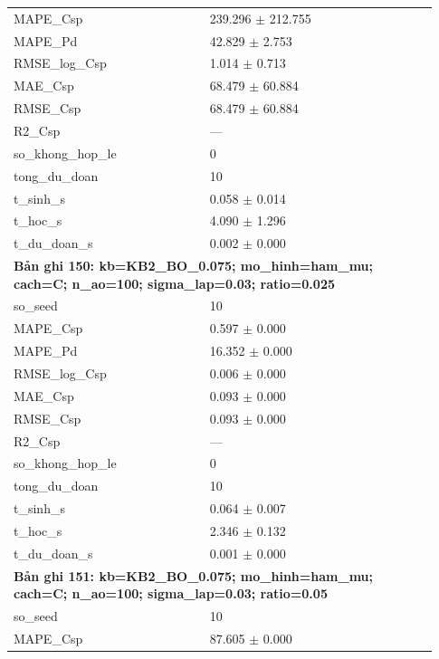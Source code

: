 \begin{longtable}{p{0.43\linewidth}p{0.50\linewidth}}
MAPE\_\allowbreak Csp & 239.296 $\pm$ 212.755 \\
MAPE\_\allowbreak Pd & 42.829 $\pm$ 2.753 \\
RMSE\_\allowbreak log\_\allowbreak Csp & 1.014 $\pm$ 0.713 \\
MAE\_\allowbreak Csp & 68.479 $\pm$ 60.884 \\
RMSE\_\allowbreak Csp & 68.479 $\pm$ 60.884 \\
R2\_\allowbreak Csp & — \\
so\_\allowbreak khong\_\allowbreak hop\_\allowbreak le & 0 \\
tong\_\allowbreak du\_\allowbreak doan & 10 \\
t\_\allowbreak sinh\_\allowbreak s & 0.058 $\pm$ 0.014 \\
t\_\allowbreak hoc\_\allowbreak s & 4.090 $\pm$ 1.296 \\
t\_\allowbreak du\_\allowbreak doan\_\allowbreak s & 0.002 $\pm$ 0.000 \\
\midrule
\multicolumn{2}{p{0.95\linewidth}}{\textbf{Bản ghi 150: kb=KB2\_BO\_0.075; mo\_hinh=ham\_mu; cach=C; n\_ao=100; sigma\_lap=0.03; ratio=0.025}} \\
so\_\allowbreak seed & 10 \\
MAPE\_\allowbreak Csp & 0.597 $\pm$ 0.000 \\
MAPE\_\allowbreak Pd & 16.352 $\pm$ 0.000 \\
RMSE\_\allowbreak log\_\allowbreak Csp & 0.006 $\pm$ 0.000 \\
MAE\_\allowbreak Csp & 0.093 $\pm$ 0.000 \\
RMSE\_\allowbreak Csp & 0.093 $\pm$ 0.000 \\
R2\_\allowbreak Csp & — \\
so\_\allowbreak khong\_\allowbreak hop\_\allowbreak le & 0 \\
tong\_\allowbreak du\_\allowbreak doan & 10 \\
t\_\allowbreak sinh\_\allowbreak s & 0.064 $\pm$ 0.007 \\
t\_\allowbreak hoc\_\allowbreak s & 2.346 $\pm$ 0.132 \\
t\_\allowbreak du\_\allowbreak doan\_\allowbreak s & 0.001 $\pm$ 0.000 \\
\midrule
\multicolumn{2}{p{0.95\linewidth}}{\textbf{Bản ghi 151: kb=KB2\_BO\_0.075; mo\_hinh=ham\_mu; cach=C; n\_ao=100; sigma\_lap=0.03; ratio=0.05}} \\
so\_\allowbreak seed & 10 \\
MAPE\_\allowbreak Csp & 87.605 $\pm$ 0.000 \\

\end{longtable}
